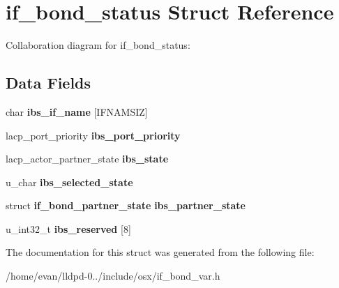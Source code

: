 \section{if\-\_\-bond\-\_\-status \-Struct \-Reference}
\label{structif__bond__status}


\-Collaboration diagram for if\-\_\-bond\-\_\-status\-:
\subsection*{\-Data \-Fields}
\begin{DoxyCompactItemize}
\item 
char {\bfseries ibs\-\_\-if\-\_\-name} [\-I\-F\-N\-A\-M\-S\-I\-Z]\label{structif__bond__status_ab6cc034448b8c26399a464e1ce38b8db}

\item 
lacp\-\_\-port\-\_\-priority {\bfseries ibs\-\_\-port\-\_\-priority}\label{structif__bond__status_a6b7607172574b93753bac1c887fb73b1}

\item 
lacp\-\_\-actor\-\_\-partner\-\_\-state {\bfseries ibs\-\_\-state}\label{structif__bond__status_a9ed11765f476815074f7d324c5ad32e0}

\item 
u\-\_\-char {\bfseries ibs\-\_\-selected\-\_\-state}\label{structif__bond__status_a863f596a865b1e896e702ea3054c021d}

\item 
struct {\bf if\-\_\-bond\-\_\-partner\-\_\-state} {\bfseries ibs\-\_\-partner\-\_\-state}\label{structif__bond__status_a2df83e0191506f48774f2abcb836227d}

\item 
u\-\_\-int32\-\_\-t {\bfseries ibs\-\_\-reserved} [8]\label{structif__bond__status_a4db8d7ae15f327bae02ccb9a55223cbb}

\end{DoxyCompactItemize}


\-The documentation for this struct was generated from the following file\-:\begin{DoxyCompactItemize}
\item 
/home/evan/lldpd-\/0../include/osx/if\-\_\-bond\-\_\-var.\-h\end{DoxyCompactItemize}
